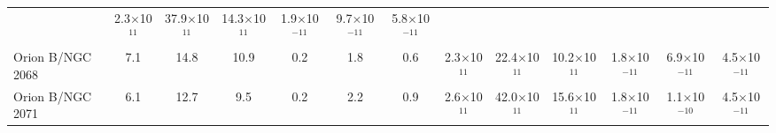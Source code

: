 \begin{table*}
\begin{threeparttable}
\begin{tabular}{|l|ccc|ccc|ccc|ccc|}
                                    	&  2.3$\times$10$^{11}$  &  37.9$\times$10$^{11}$& 14.3$\times$10$^{11}$   &  1.9$\times$10$^{-11}$  &  9.7$\times$10$^{-11}$  &   5.8$\times$10$^{-11}$   \\
Orion B/NGC 2068       & 7.1 & 14.8 & 10.9 & 0.2    & 1.8    & 0.6
                                    	&  2.3$\times$10$^{11}$ &  22.4$\times$10$^{11}$ & 10.2$\times$10$^{11}$   &   1.8$\times$10$^{-11}$  &  6.9$\times$10$^{-11}$  &   4.5$\times$10$^{-11}$   \\
Orion B/NGC 2071       & 6.1 & 12.7  & 9.5  & 0.2    &  2.2   &0.9
                                    	&  2.6$\times$10$^{11}$  & 42.0$\times$10$^{11}$ & 15.6$\times$10$^{11}$   &  1.8$\times$10$^{-11}$  &  1.1$\times$10$^{-10}$  &   4.5$\times$10$^{-11}$   \\
\hline
\end{tabular}
\end{threeparttable}
\end{table*}

